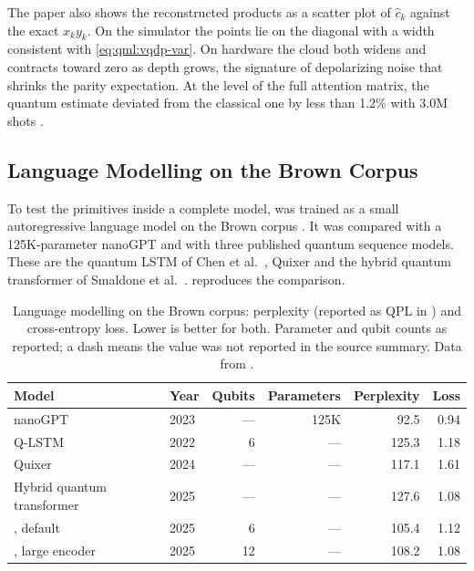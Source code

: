 The paper also shows the reconstructed products as a scatter plot of $\hat{c}_k$ against the exact $x_k y_k$. On the simulator the points lie on the diagonal with a width consistent with \cref{eq:qml:vqdp-var}. On hardware the cloud both widens and contracts toward zero as depth grows, the signature of depolarizing noise that shrinks the parity expectation. At the level of the full attention matrix, the quantum estimate deviated from the classical one by less than 1.2\% with $3.0$M shots \cite{guo2025vqt}.

\subsection{Language Modelling on the Brown Corpus}\label{sec:qml:vqt:lm}

To test the primitives inside a complete model, \vqt{} was trained as a small autoregressive language model on the Brown corpus \cite{francis1979brown}. It was compared with a 125K-parameter nanoGPT \cite{karpathy2023nanogpt} and with three published quantum sequence models. These are the quantum LSTM of Chen et al.~\cite{chen2022qlstm}, Quixer \cite{khatri2024quixer} and the hybrid quantum transformer of Smaldone et al.~\cite{smaldone2025hybridqt}.  reproduces the comparison.

\begin{table}[htbp]
\caption{Language modelling on the Brown corpus: perplexity (reported as QPL in \cite{guo2025vqt}) and cross-entropy loss. Lower is better for both. Parameter and qubit counts as reported; a dash means the value was not reported in the source summary. Data from \cite{guo2025vqt}.}\label{tab:qml:vqt-lm}
\centering
\small
\begin{tabular}{@{}llrrrr@{}}
\toprule
Model & Year & Qubits & Parameters & Perplexity & Loss \\
\midrule
nanoGPT \cite{karpathy2023nanogpt} & 2023 & --- & 125K & 92.5 & 0.94 \\
Q-LSTM \cite{chen2022qlstm} & 2022 & 6 & --- & 125.3 & 1.18 \\
Quixer \cite{khatri2024quixer} & 2024 & --- & --- & 117.1 & 1.61 \\
Hybrid quantum transformer & 2025 & --- & --- & 127.6 & 1.08 \\
\vqt{}, default & 2025 & 6 & --- & 105.4 & 1.12 \\
\vqt{}, large encoder & 2025 & 12 & --- & 108.2 & 1.08 \\
\bottomrule
\end{tabular}
\end{table}

